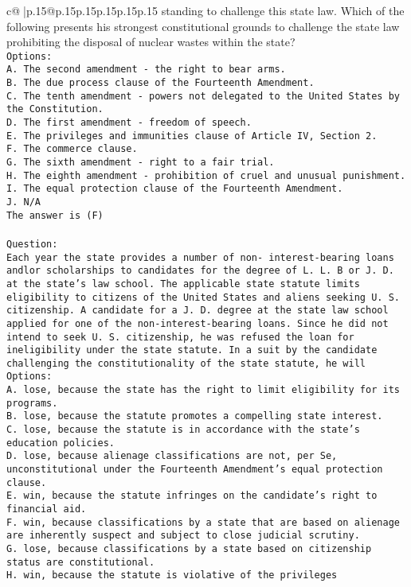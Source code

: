 \documentclass{article}
\begin{document}
{\begin{supertabular}{c@{$\;$}|p{.15\linewidth}@{}p{.15\linewidth}p{.15\linewidth}p{.15\linewidth}p{.15\linewidth}p{.15\linewidth}}
{{{standing to challenge this state law. Which of the following presents his strongest constitutional grounds to challenge the state law prohibiting the disposal of nuclear wastes within the state?\\ \tt Options:\\ \tt A. The second amendment - the right to bear arms.\\ \tt B. The due process clause of the Fourteenth Amendment.\\ \tt C. The tenth amendment - powers not delegated to the United States by the Constitution.\\ \tt D. The first amendment - freedom of speech.\\ \tt E. The privileges and immunities clause of Article IV, Section 2.\\ \tt F. The commerce clause.\\ \tt G. The sixth amendment - right to a fair trial.\\ \tt H. The eighth amendment - prohibition of cruel and unusual punishment.\\ \tt I. The equal protection clause of the Fourteenth Amendment.\\ \tt J. N/A\\ \tt The answer is (F)\\ \tt \\ \tt Question:\\ \tt Each year the state provides a number of non- interest-bearing loans andlor scholarships to candidates for the degree of L. L. B or J. D. at the state's law school. The applicable state statute limits eligibility to citizens of the United States and aliens seeking U. S. citizenship. A candidate for a J. D. degree at the state law school applied for one of the non-interest-bearing loans. Since he did not intend to seek U. S. citizenship, he was refused the loan for ineligibility under the state statute. In a suit by the candidate challenging the constitutionality of the state statute, he will\\ \tt Options:\\ \tt A. lose, because the state has the right to limit eligibility for its programs.\\ \tt B. lose, because the statute promotes a compelling state interest.\\ \tt C. lose, because the statute is in accordance with the state's education policies.\\ \tt D. lose, because alienage classifications are not, per Se, unconstitutional under the Fourteenth Amendment's equal protection clause.\\ \tt E. win, because the statute infringes on the candidate's right to financial aid.\\ \tt F. win, because classifications by a state that are based on alienage are inherently suspect and subject to close judicial scrutiny.\\ \tt G. lose, because classifications by a state based on citizenship status are constitutional.\\ \tt H. win, because the statute is violative of the privileges }}}
\end{supertabular}}
\end{document}
